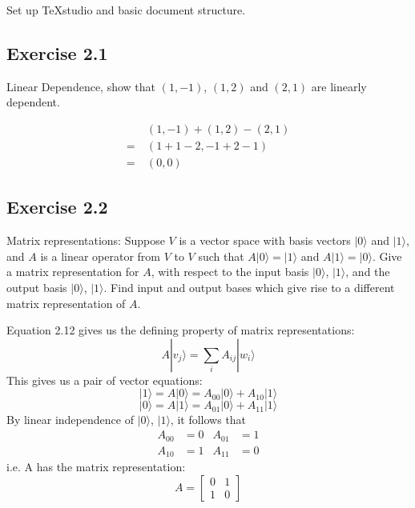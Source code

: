\documentclass[]{article}
\begin{document}
Set up TeXstudio and basic document structure.

\subsection{Exercise 2.1}
Linear Dependence, show that $(1,-1)$, $(1,2)$ and $(2,1)$ are linearly dependent.

\begin{align*}
	&(1, -1) + (1, 2) - (2, 1) \\
=\ &(1+1-2, -1+2-1) \\
=\ &(0, 0)
\end{align*}

\subsection{Exercise 2.2}
Matrix representations: Suppose $V$ is a vector space with basis vectors $|0\rangle$ and $|1\rangle$, and $A$ is a linear operator from $V$ to $V$ such that $A|0\rangle=|1\rangle$ and $A|1\rangle=|0\rangle$. Give a matrix representation for $A$, with respect to the input basis $|0\rangle$, $|1\rangle$, and the output basis $|0\rangle$, $|1\rangle$. Find input and output bases which give rise to a different matrix representation of $A$.

Equation 2.12 gives us the defining property of matrix representations:
\[A|v_j\rangle=\sum_i A_{ij}|w_i\rangle\]
This gives us a pair of vector equations:
\[
|1\rangle = A|0\rangle = A_{00}|0\rangle + A_{10}|1\rangle
\]
\[
|0\rangle = A|1\rangle = A_{01}|0\rangle + A_{11}|1\rangle
\]
By linear independence of $|0\rangle$, $|1\rangle$, it follows that
\begin{align*}
A_{00} &= 0 & A_{01} &= 1 \\
A_{10} &= 1 & A_{11} &= 0
\end{align*}
i.e. A has the matrix representation:
\[
A = \left[\begin{matrix}
0 & 1 \\
1 & 0
\end{matrix}\right]
\]
\end{document}
